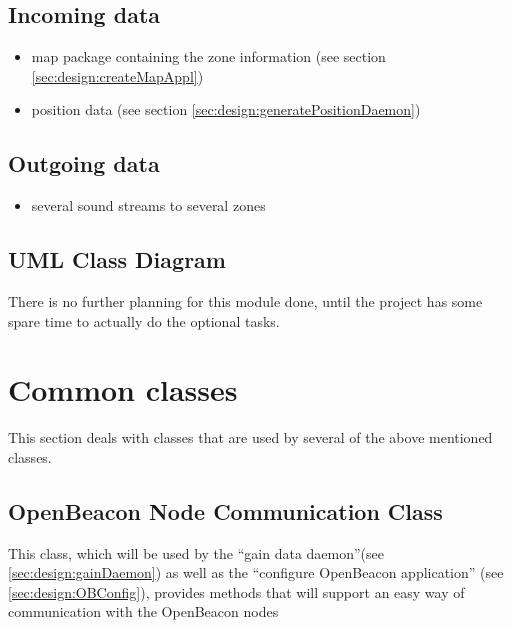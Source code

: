    \subsection{Incoming data}
    \begin{itemize}
     \item map package containing the zone information (see section \ref{sec:design:createMapAppl})
     \item position data (see section \ref{sec:design:generatePositionDaemon})
    \end{itemize}

   \subsection{Outgoing data}
    \begin{itemize}
     \item several sound streams to several zones
    \end{itemize}

   \subsection{UML Class Diagram}
    There is no further planning for this module done, until the project has some spare time to actually do the optional tasks.

  \section{Common classes}
   This section deals with classes that are used by several of the above mentioned classes.
   \subsection{OpenBeacon Node Communication Class}
    This class, which will be used by the ``gain data daemon''(see \ref{sec:design:gainDaemon}) as well as the ``configure OpenBeacon application'' (see \ref{sec:design:OBConfig}), provides methods that will support an easy way of communication with the OpenBeacon nodes


